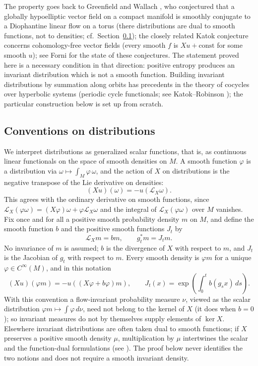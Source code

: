 \documentclass[11pt]{article}
\theoremstyle{remark}
\newcommand{\LX}{\mathcal L_X}
\begin{document}
The property goes back to Greenfield and Wallach
\cite{GreenfieldWallach1973}, who conjectured that a globally
hypoelliptic vector field on a compact manifold is smoothly conjugate
to a Diophantine linear flow on a torus (there distributions are
dual to smooth functions, not to densities; cf.\
Section~\ref{sec:conventions}); the closely related Katok
conjecture concerns cohomology-free vector fields (every smooth
\(f\) is \(Xu+\mathrm{const}\) for some smooth \(u\)); see Forni
\cite{Forni2008} for the state of these conjectures.
The statement proved here is a necessary condition in that direction:
positive entropy produces an invariant distribution which is not a
smooth function.
Building invariant distributions by summation along orbits has
precedents in the theory of cocycles over hyperbolic systems
(periodic cycle functionals; see Katok--Robinson
\cite{KatokRobinson2001}); the particular construction below is set
up from scratch.

\subsection{Conventions on distributions}
\label{sec:conventions}

We interpret distributions as generalized scalar functions, that is,
as continuous linear functionals on the space of smooth densities on
\(M\).  A smooth function \(\varphi\) is a distribution via
\(\omega\mapsto\int_M\varphi\,\omega\), and the action of \(X\) on
distributions is the negative transpose of the Lie derivative on
densities:
\[
 (Xu)(\omega)=-u(\mathcal L_X\omega).
\]
This agrees with the ordinary derivative on smooth functions, since
\(\LX(\varphi\omega)=(X\varphi)\omega+\varphi\LX\omega\) and the
integral of \(\LX(\varphi\omega)\) over \(M\) vanishes.
Fix once and for all a positive smooth probability density \(m\) on
\(M\), and define the smooth function \(b\) and the positive smooth
functions \(J_t\) by
\[
 \mathcal L_Xm=bm,\qquad g_t^*m=J_tm .
\]
No invariance of \(m\) is assumed; \(b\) is the divergence of \(X\)
with respect to \(m\), and \(J_t\) is the Jacobian of \(g_t\)
with respect to \(m\).  Every smooth density is \(\varphi m\) for a
unique \(\varphi\in C^\infty(M)\), and in this notation
\begin{equation}\label{eq:scalar}
 (Xu)(\varphi m)=-u((X\varphi+b\varphi)m),\qquad
 J_t(x)=\exp\!\left(\int_0^t b(g_sx)\,ds\right).
\end{equation}
With this convention a flow-invariant probability measure \(\nu\),
viewed as the scalar distribution \(\varphi m\mapsto\int\varphi\,d\nu\),
need not belong to the kernel of \(X\) (it does when \(b=0\)); so
invariant measures do not by themselves supply elements of
\(\ker X\).
Elsewhere invariant distributions are often taken dual to smooth
functions; if \(X\) preserves a positive smooth density \(\mu\),
multiplication by \(\mu\) intertwines the scalar and the
function-dual formulations (see \cite[Section~3]{Forni2008}).  The
proof below never identifies the two notions and does not require a
smooth invariant density.
\end{document}
